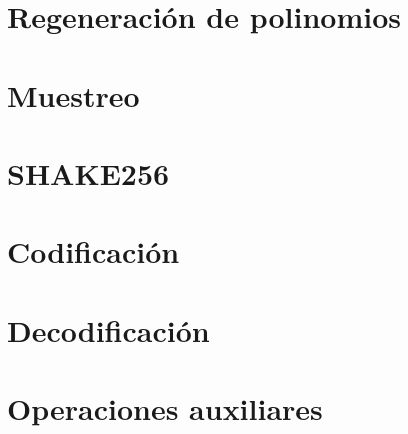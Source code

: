 \clearpage
\section{Regeneración de polinomios}


\clearpage
\section{Muestreo}


\clearpage
\section{SHAKE256}


\clearpage
\section{Codificación}


\clearpage
\section{Decodificación}


\clearpage
\section{Operaciones auxiliares}


\clearpage
